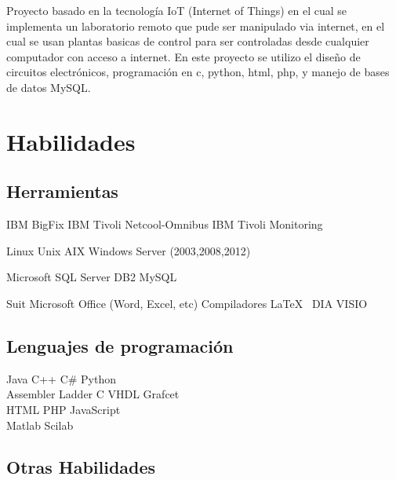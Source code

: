 \documentclass[]{deedy-resume-openfont}
\begin{document}
Proyecto basado en la tecnología IoT (Internet of Things) en el cual se implementa un laboratorio remoto que pude ser manipulado via internet, en el cual se usan plantas basicas de control para ser controladas desde cualquier computador con acceso a internet. En este proyecto se utilizo el diseño de circuitos electrónicos, programación en c, python, html, php, y manejo de bases de datos MySQL.
\sectionsep



\section{Habilidades}
\begin{minipage}[t]{.6\textwidth}


\subsection{Herramientas}

 IBM BigFix \textbullet{} IBM Tivoli Netcool-Omnibus \textbullet{} IBM Tivoli Monitoring  

 Linux \textbullet{} Unix \textbullet{} AIX \textbullet{} Windows Server (2003,2008,2012)  
 
 Microsoft SQL Server \textbullet{} DB2 \textbullet{} MySQL  

 Suit Microsoft Office (Word, Excel, etc)  \textbullet{} Compiladores \LaTeX\ \textbullet{} DIA \textbullet{} VISIO \sectionsep
 
\subsection{Lenguajes de programación}
Java \textbullet{} C++ \textbullet{} C\# \textbullet{} Python \\

Assembler \textbullet{} Ladder \textbullet{} C \textbullet{} VHDL \textbullet{} Grafcet\\ 
HTML \textbullet{} PHP \textbullet{} JavaScript \\

Matlab \textbullet{} Scilab  \sectionsep

\subsection{Otras Habilidades}
\sectionsep

 
\end{minipage}
\end{document}
